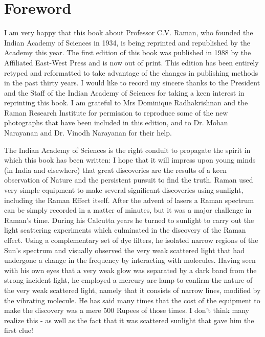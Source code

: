 \chapter*{Foreword}
 

I am very happy that this book about Professor C.V\@. Raman, who founded the Indian Academy of Sciences in 1934, is being reprinted and republished by the Academy this year. The first edition of this book was published in 1988 by the Affiliated East-West Press and is now out of print. This edition has been entirely retyped and reformatted to take advantage of the changes in publishing methods in the past thirty years. I would like to record my sincere thanks to the President and the Staff of the Indian Academy of Sciences for taking a keen interest in reprinting this book. I am grateful to Mrs Dominique Radhakrishnan and the Raman Research Institute for permission to reproduce some of the new photographs that have been included in this edition, and to Dr\@. Mohan Narayanan and Dr\@. Vinodh Narayanan for their help. 

The Indian Academy of Sciences is the right conduit to propagate the spirit in which this book has been written: I hope that it will impress upon young minds (in India and elsewhere) that great discoveries are the results of a keen observation of Nature and the persistent pursuit to find the truth. Raman used very simple equipment to make several significant discoveries using sunlight, including the Raman Effect itself. After the advent of lasers a Raman spectrum can be simply recorded in a matter of minutes,  but it was a major challenge in Raman's time. During his Calcutta years he turned to sunlight to carry out the light scattering experiments which culminated in the discovery of the Raman effect. Using a complementary set of dye filters, he isolated narrow regions of the Sun's spectrum and visually observed the very weak scattered light that had undergone a change in the frequency by interacting with molecules. Having seen with his own eyes that a very weak glow was separated by a dark band from the strong incident light, he employed a mercury arc lamp to confirm the nature of the very weak scattered light, namely that it consists of narrow lines, modified by the vibrating molecule. He has said many times that the cost of the equipment to make the discovery was a mere 500 Rupees of those times. I don't think many realize this - as well as the fact that it was scattered sunlight that gave him the first clue!

